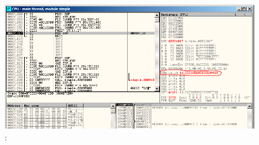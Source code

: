 \begin{figure}[H]
\centering
\includegraphics[scale=\FigScale]{patterns/12_FPU/1_simple/olly5.png}
\caption{\olly: \FADDP {}}
\label{fig:FPU_simple_olly_5}
\end{figure}
\fi
